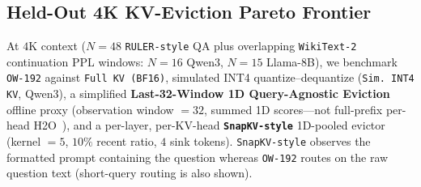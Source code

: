 \documentclass[10pt]{article}
\renewcommand{\_}{\origunderscore\allowbreak}
\begin{document}
\subsection{Held-Out 4K KV-Eviction Pareto Frontier}
\label{sec:kv4k}
At $4\text{K}$ context ($N=48$ \texttt{RULER-style} QA plus overlapping \texttt{WikiText-2} continuation PPL windows: $N=16$ Qwen3, $N=15$ Llama-8B), we benchmark \texttt{OW-192} against \texttt{Full KV (BF16)}, simulated INT4 quantize--dequantize (\texttt{Sim.\ INT4 KV}, Qwen3), a simplified \textbf{Last-32-Window 1D Query-Agnostic Eviction} offline proxy (observation window $=32$, summed 1D scores---not full-prefix per-head H2O~\citep{zhang2023h2o}), and a per-layer, per-KV-head \textbf{\texttt{SnapKV-style}} 1D-pooled evictor (kernel $=5$, $10\%$ recent ratio, $4$ sink tokens). \texttt{SnapKV-style} observes the formatted prompt containing the question whereas \texttt{OW-192} routes on the raw question text (short-query routing is also shown).
\end{document}
